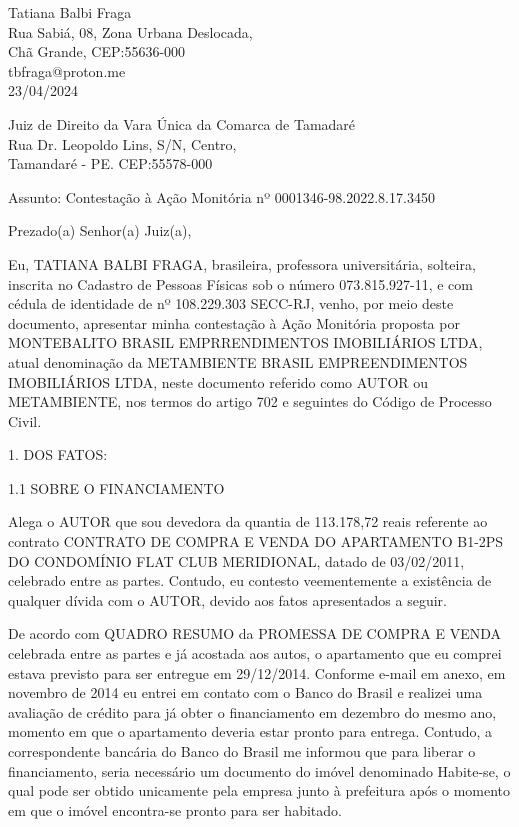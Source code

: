 \documentclass[11pt]{letter}
\begin{document}

Tatiana Balbi Fraga \\
Rua Sabiá, 08, Zona Urbana Deslocada,  \\
Chã Grande, CEP:55636-000 \\
tbfraga@proton.me \\

23/04/2024

Juiz de Direito da Vara Única da Comarca de Tamadaré \\
Rua Dr. Leopoldo Lins, S/N, Centro, \\
Tamandaré - PE. CEP:55578-000

Assunto: Contestação à Ação Monitória nº 0001346-98.2022.8.17.3450

Prezado(a) Senhor(a) Juiz(a),

Eu, TATIANA BALBI FRAGA,
brasileira, professora universitária, solteira, inscrita no Cadastro de Pessoas Físicas sob o número 073.815.927-11, e com cédula de identidade de nº 108.229.303 SECC-RJ, venho, por meio deste documento, apresentar minha contestação à Ação Monitória proposta por MONTEBALITO BRASIL EMPRRENDIMENTOS IMOBILIÁRIOS LTDA, atual
denominação da METAMBIENTE BRASIL EMPREENDIMENTOS IMOBILIÁRIOS LTDA, neste documento referido como AUTOR ou METAMBIENTE, nos termos do artigo 702 e seguintes do Código de Processo Civil.

1. DOS FATOS:

1.1 SOBRE O FINANCIAMENTO

Alega o AUTOR que sou devedora da quantia de 113.178,72 reais referente ao contrato CONTRATO DE COMPRA E VENDA DO APARTAMENTO B1-2PS DO CONDOMÍNIO FLAT CLUB MERIDIONAL, datado de 03/02/2011, celebrado entre as partes. Contudo, eu contesto veementemente a existência de qualquer dívida com o AUTOR, devido aos fatos apresentados a seguir.

De acordo com QUADRO RESUMO da PROMESSA DE COMPRA E VENDA celebrada entre as partes e já acostada aos autos, o apartamento que eu comprei estava previsto para ser entregue em 29/12/2014. Conforme e-mail em anexo, em novembro de 2014 eu entrei em contato com o Banco do Brasil e realizei uma avaliação de crédito para já obter o financiamento em dezembro do mesmo ano, momento em que o apartamento deveria estar pronto para entrega. Contudo, a correspondente bancária do Banco do Brasil me informou que para liberar o financiamento, seria necessário um documento do imóvel denominado Habite-se, o qual pode ser obtido unicamente pela empresa junto à prefeitura após o momento em que o imóvel encontra-se pronto para ser habitado.
\end{document}
